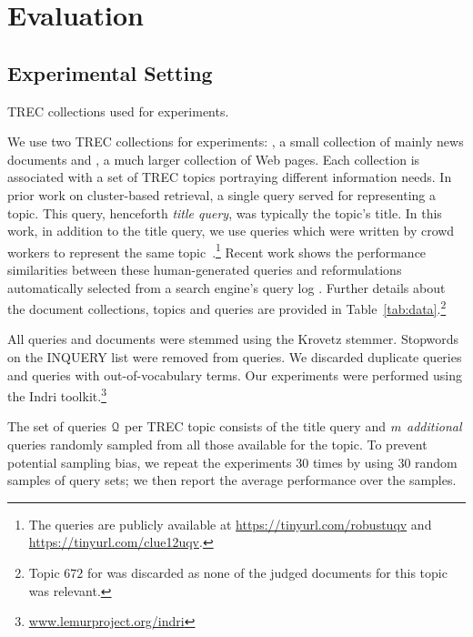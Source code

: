 \section{Evaluation}
\label{sec:eval}

\subsection{Experimental Setting}
\label{sec:expSet}

\begin{table}[t]
\caption{\label{tab:data} TREC collections used for experiments.}

\end{table}


 We use two TREC collections for experiments:
\robust, a small collection of mainly news documents and \cw, a much
larger collection of Web pages. Each collection is associated with a
set of TREC topics portraying different information needs. In prior
work on cluster-based retrieval, a single query served for
representing a topic. This query, henceforth \emph{title query}, was
typically the topic's title.  In this work, in addition to the title
query, we use queries which were written by crowd workers to represent
the same topic~\cite{bailey2016uqv100,bc17-adcs}.\footnote{The queries
  are publicly available at \url{https://tinyurl.com/robustuqv} and
  \url{https://tinyurl.com/clue12uqv}.} Recent work shows the
performance similarities between these human-generated queries and
reformulations automatically selected from a search engine's query log \cite{Liu+al:19a}.
Further details about the
document collections, topics and queries are provided in
Table~\ref{tab:data}.\footnote{Topic $672$ for \robust was discarded
  as none of the judged documents for this topic was relevant.}


All queries and documents were stemmed using the Krovetz stemmer. Stopwords on the INQUERY list were removed from queries. We discarded duplicate queries and queries with out-of-vocabulary terms. Our experiments were performed using the Indri toolkit.\footnote{\url{www.lemurproject.org/indri}} 

The set of queries ${\mathcal Q}$ per TREC topic consists of the title
query and $m$ {\em additional} queries randomly sampled from
all those available for the topic. To prevent potential sampling bias,
we repeat the experiments $30$ times by using $30$ random samples of query sets; we
then report the average performance over the samples.

